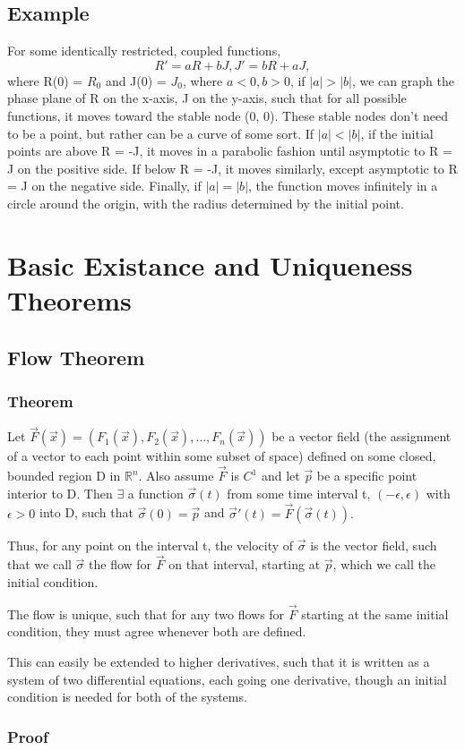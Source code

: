 \documentclass[11 pt, twoside]{article}
\newcommand{\realn}{\mathbb{R}^n}
\begin{document}
\subsection{Example}

For some identically restricted, coupled functions, $$R' = aR + bJ, J' = bR + aJ,$$ where R(0) = $R_0$ and J(0) = $J_0$, where $a < 0, b > 0$, if $|a| > |b|$, we can graph the phase plane of R on the x-axis, J on the y-axis, such that for all possible functions, it moves toward the stable node (0, 0). These stable nodes don't need to be a point, but rather can be a curve of some sort. If $|a| < |b|$, if the initial points are above R = -J, it moves in a parabolic fashion until asymptotic to R = J on the positive side. If below R = -J, it moves similarly, except asymptotic to R = J on the negative side. Finally, if $|a| = |b|$, the function moves infinitely in a circle around the origin, with the radius determined by the initial point.

\section{Basic Existance and Uniqueness Theorems}

\subsection{Flow Theorem}
\subsubsection*{Theorem} 
Let $\vec{F}(\vec{x}) = (F_1(\vec{x}), F_2(\vec{x}), \dots, F_n(\vec{x}))$ be a vector field (the assignment of a vector to each point within some subset of space) defined on some closed, bounded region D in $\realn$. Also assume $\vec{F}$ is $C^1$ and let $\vec{p}$ be a specific point interior to D. Then $\exists$ a function $\vec{\sigma}(t)$ from some time interval t, $(-\epsilon, \epsilon)$ with $\epsilon > 0$ into D, such that $\vec{\sigma}(0) = \vec{p}$ and $\vec{\sigma}'(t) = \vec{F}(\vec{\sigma}(t)).$

Thus, for any point on the interval t, the velocity of $\vec{\sigma}$ is the vector field, such that we call $\vec{\sigma}$ the flow for $\vec{F}$ on that interval, starting at $\vec{p}$, which we call the initial condition.

The flow is unique, such that for any two flows for $\vec{F}$ starting at the same initial condition, they must agree whenever both are defined.

This can easily be extended to higher derivatives, such that it is written as a system of two differential equations, each going one derivative, though an initial condition is needed for both of the systems.

\subsubsection*{Proof}
\end{document}
